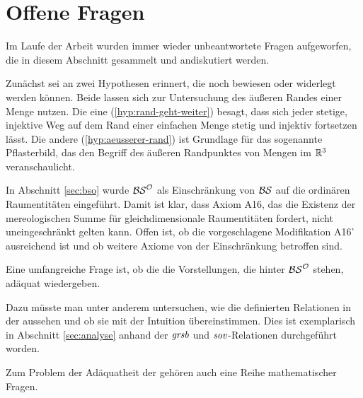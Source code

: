 
    \section{Offene Fragen}\label{sec:offene-fragen} %
    Im Laufe der Arbeit wurden immer wieder unbeantwortete Fragen aufgeworfen, die in diesem Abschnitt gesammelt und andiskutiert werden.
    
    Zunächst
    sei an zwei Hypothesen erinnert, die noch bewiesen oder widerlegt werden können. Beide lassen sich zur Untersuchung des äußeren Randes einer Menge nutzen. 
    Die eine (\ref{hyp:rand-geht-weiter}) besagt, dass sich jeder stetige, injektive Weg auf dem Rand einer einfachen Menge stetig und injektiv fortsetzen lässt.
    Die andere (\ref{hyp:aeusserer-rand}) ist Grundlage für das sogenannte Pflasterbild, das den Begriff des äußeren Randpunktes von Mengen im $\mathbb{R}^3$ veranschaulicht.
    
    
    In
    \marginpar{$\theoryBSO$}
    Abschnitt \ref{sec:bso} wurde $\theoryBSO$ als Einschränkung von $\mathcal{BS}$ auf die ordinären Raumentitäten eingeführt. Damit ist klar, dass Axiom A16, das die Existenz der mereologischen Summe für gleichdimensionale Raumentitäten fordert, nicht uneingeschränkt gelten kann. Offen ist, ob die vorgeschlagene Modifikation A16' ausreichend ist und ob weitere Axiome von der Einschränkung betroffen sind.
    
    Eine umfangreiche Frage ist, ob die \strukt die Vorstellungen, die hinter $\theoryBSO$ stehen, adäquat wiedergeben.
    
    Dazu
    müsste man unter anderem untersuchen, wie die definierten Relationen in der \strukt aussehen und ob sie mit der Intuition übereinstimmen. 
    Dies ist exemplarisch in Abschnitt \ref{sec:analyse} anhand der $\mathit{gr\hspace*{-0.25ex}sb}$ und $\mathit{sov}$-Relationen durchgeführt worden.
    
    Zum Problem der Adäquatheit der \strukt gehören auch eine Reihe mathematischer Fragen.
    
